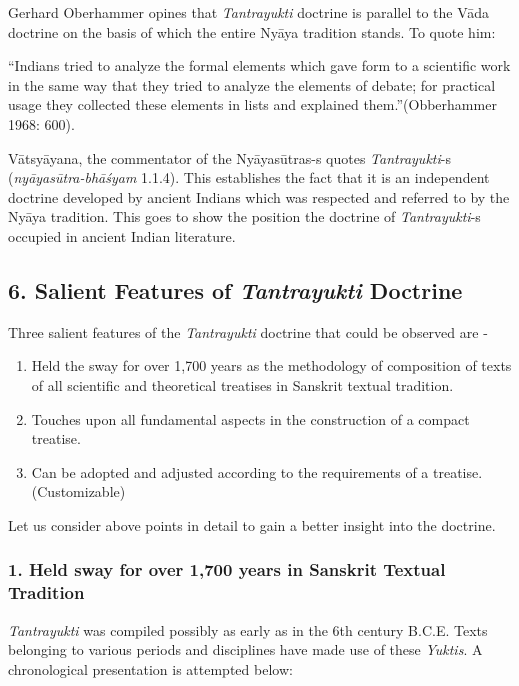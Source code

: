 Gerhard Oberhammer opines that \textit{Tantrayukti} doctrine is parallel to the Vāda doctrine on the basis of which the entire Nyāya tradition stands. To quote him:

“Indians tried to analyze the formal elements which gave form to a scientific work in the same way that they tried to analyze the elements of debate; for practical usage they collected these elements in lists and explained them.”\hfill (Obberhammer 1968: 600).

Vātsyāyana, the commentator of the Nyāyasūtras-s quotes \textit{Tantrayukti}-s (\textit{nyāyasūtra-bhāśyam} 1.1.4). This establishes the fact that it is an independent doctrine developed by ancient Indians which was respected and referred to by the Nyāya tradition. This goes to show the position the doctrine of \textit{Tantrayukti}-s occupied in ancient Indian literature.


\subsection*{6. Salient Features of \textit{Tantrayukti} Doctrine}

Three salient features of the \textit{Tantrayukti} doctrine that could be observed are -

\begin{enumerate}[{\rm 1.}]
\itemsep=0pt
\item Held the sway for over 1,700 years as the methodology of composition of texts of all scientific and theoretical treatises in Sanskrit textual tradition.

 \item Touches upon all fundamental aspects in the construction of a compact treatise.

 \item Can be adopted and adjusted according to the requirements of a treatise. (Customizable)

\end{enumerate}

Let us consider above points in detail to gain a better insight into the doctrine.

\subsubsection*{1. Held sway for over 1,700 years in Sanskrit Textual Tradition}

\textit{Tantrayukti} was compiled possibly as early as in the 6th century B.C.E. Texts belonging to various periods and disciplines have made use of these \textit{Yuktis}. A chronological presentation is attempted below:

